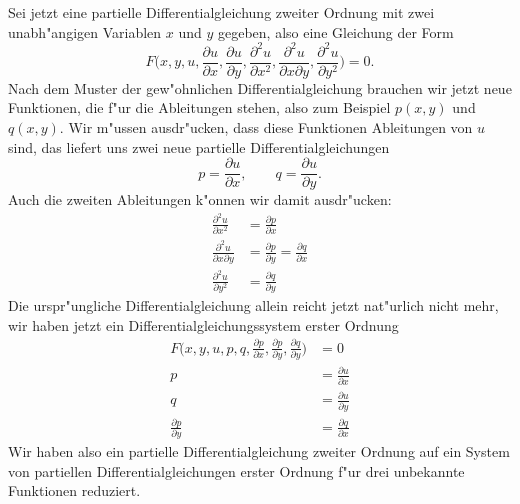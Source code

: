 Sei jetzt eine partielle Differentialgleichung zweiter Ordnung mit
zwei unabh"angigen Variablen $x$ und $y$ gegeben, also eine 
Gleichung der Form
\[
F\biggl(x,y,u,\frac{\partial u}{\partial x},\frac{\partial u}{\partial y},
\frac{\partial^2 u}{\partial x^2},\frac{\partial^2 u}{\partial x\partial y},
\frac{\partial^2u}{\partial y^2}\biggr)=0.
\]
Nach dem Muster der gew"ohnlichen Differentialgleichung brauchen wir
jetzt neue Funktionen, die f"ur die Ableitungen stehen, also zum
Beispiel $p(x,y)$ und $q(x,y)$. Wir m"ussen ausdr"ucken, dass diese
Funktionen Ableitungen von $u$ sind, das liefert uns zwei neue
partielle Differentialgleichungen
\[
p=\frac{\partial u}{\partial x},\qquad q=\frac{\partial u}{\partial y}.
\]
Auch die zweiten Ableitungen k"onnen wir damit ausdr"ucken:
\begin{align*}
\frac{\partial^2 u}{\partial x^2}&=\frac{\partial p}{\partial x}\\
\frac{\partial^2 u}{\partial x\partial y}&=\frac{\partial p}{\partial y}=\frac{\partial q}{\partial x}\\
\frac{\partial^2 u}{\partial y^2}&=\frac{\partial q}{\partial y}
\end{align*}
Die urspr"ungliche Differentialgleichung allein reicht jetzt
nat"urlich nicht mehr, wir haben jetzt ein Differentialgleichungssystem
erster Ordnung
\begin{align*}
F\biggl(x,y,u,p,q,\frac{\partial p}{\partial x},\frac{\partial p}{\partial y},\frac{\partial q}{\partial y}\biggr)&=0\\
p&=\frac{\partial u}{\partial x}\\
q&=\frac{\partial u}{\partial y}\\
\frac{\partial p}{\partial y}&=\frac{\partial q}{\partial x}
\end{align*}
Wir haben also ein partielle Differentialgleichung zweiter Ordnung auf
ein System von partiellen Differentialgleichungen erster Ordnung f"ur
drei unbekannte Funktionen reduziert.


